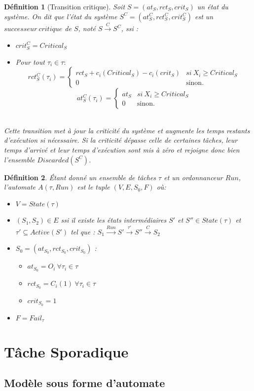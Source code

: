 \documentclass[a4paper]{report}
\theoremstyle{break}
\newtheorem{defin}{Définition}
\begin{document}
\begin{defin}[Transition critique]
Soit $S = (at_S, rct_S, crit_S)$ un état du système. On dit que l'état du système $S^C = (at_S^C, rct_S^C, crit_S^C)$ est un $successeur\ critique$ de $S$, noté $S\xrightarrow{C}S^C$, ssi :
\begin{itemize}
\item $crit_S^C = Critical_S$
\item Pour tout $\tau_i \in \tau :$
$$ rct_S^C(\tau_i) = \left\{
    \begin{array}{ll}
        rct_S+c_i(Critical_S)-c_i(crit_S) & si\ X_i\geq Critical_S \\
        0 & \mbox{sinon.}
    \end{array}
\right.
$$
$$ at_S^C(\tau_i) = \left\{
    \begin{array}{ll}
        at_S & si\ X_i\geq Critical_S \\
        0 & \mbox{sinon.}
    \end{array}
\right.
$$\\
\end{itemize}
Cette transition met à jour la criticité du système et augmente les temps restants d'exécution si nécessaire. Si la criticité dépasse celle de certaines tâches, leur temps d'arrivé et leur temps d'exécution sont mis à zéro et rejoigne donc bien l'ensemble $Discarded(S^C)$.
\end{defin}

\begin{defin} Étant donné un ensemble de tâches $\tau$ et un ordonnanceur $Run$, l'automate $A(\tau,Run)$ est le tuple $(V, E, S_0, F)$ où:
\begin{itemize}
\item  $V=State(\tau)$
\item $(S_1,S_2) \in E$ ssi il existe les états intermédiaires $S'$ et $S'' \in State(\tau)$ et $\tau' \subseteq Active(S') $ tel que : $S_1\xrightarrow{Run}S'\xrightarrow{\tau'}S''\xrightarrow{C}S_2$
\item $S_0 = (at_{S_0}, rct_{S_0}, crit_{S_0})$ :\begin{itemize}
\item $at_{S_0} = O_i\ \forall \tau_i \in \tau$
\item $rct_{S_0} = C_i(1)\ \forall \tau_i \in \tau$
\item $crit_{S_0} = 1$
\end{itemize}
\item $F = Fail_\tau$
\end{itemize}

\end{defin} 


\section{Tâche Sporadique}
\subsection{Modèle sous forme d'automate}







%

\end{document}
